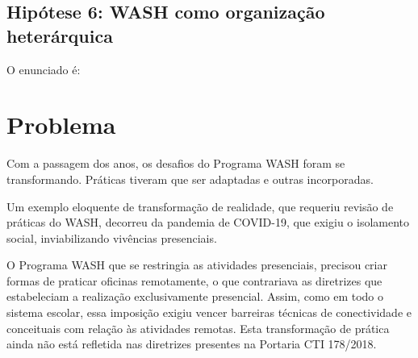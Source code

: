 \documentclass[
12pt,		%
openright,	%
twoside,  %
a4paper,			%
chapter=TITLE,		%
english,			%
french,				%
spanish,			%
brazil				%
]{USPSC-classe/USPSC}
\begin{document}
\subsection[Hip\'otese 6: WASH como organiza\c{c}\~ao heter\'arquica]{Hip\'otese 6: WASH como organiza\c{c}\~ao heter\'arquica}\label{Hip\'otese 6: WASH como organiza\c{c}\~ao heter\'arquica}
O enunciado \'e:










\noindent\begin{center}\mbox{\centering{}}\end{center}


\section[Problema]{Problema}\label{Problema}
Com a passagem dos anos, os desafios do Programa WASH foram se transformando. Pr\'aticas tiveram que ser adaptadas e outras incorporadas.









Um exemplo eloquente de transforma\c{c}\~ao de realidade, que requeriu revis\~ao de pr\'aticas do WASH, decorreu da pandemia de COVID-19, que exigiu o isolamento social, inviabilizando viv\^encias presenciais.









O Programa WASH que se restringia as atividades presenciais, precisou criar formas de praticar oficinas remotamente, o que contrariava as diretrizes que estabeleciam a realiza\c{c}\~ao exclusivamente presencial. Assim, como em todo o sistema escolar, essa imposi\c{c}\~ao exigiu vencer barreiras t\'ecnicas de conectividade e conceituais com rela\c{c}\~ao \`as atividades remotas. Esta transforma\c{c}\~ao de pr\'atica ainda n\~ao est\'a refletida nas diretrizes presentes na Portaria CTI 178/2018.
\end{document}
